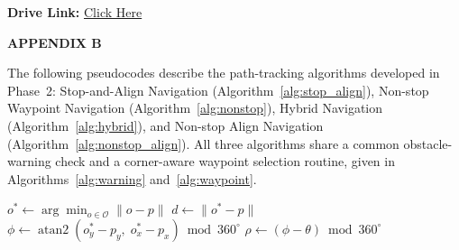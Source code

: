 \documentclass[12pt]{report}
\begin{document}
\vspace{6pt}
\noindent\textbf{Drive Link:} \href{https://drive.google.com/drive/folders/1MPjqoa25L6bo5l17mARg9OGJC1Rv1Niw?usp=drive_link}{Click Here}

\clearpage
\thispagestyle{fancy}
\begin{center}
\textbf{APPENDIX B}
\end{center}

\noindent The following pseudocodes describe the path-tracking algorithms
developed in Phase~2: Stop-and-Align Navigation (Algorithm~\ref{alg:stop_align}),
Non-stop Waypoint Navigation (Algorithm~\ref{alg:nonstop}), Hybrid Navigation
(Algorithm~\ref{alg:hybrid}), and Non-stop Align Navigation
(Algorithm~\ref{alg:nonstop_align}). All three algorithms share a common obstacle-warning
check and a corner-aware waypoint selection routine, given in
Algorithms~\ref{alg:warning} and~\ref{alg:waypoint}.

\vspace{4pt}
{\small
\begin{algorithm}[H]
\caption{CheckWarning$(p,\theta,\mathcal{O},d_{\mathrm{warn}},d_{\mathrm{crit}})$}
\label{alg:warning}
\DontPrintSemicolon
{}
\BlankLine
{}
$o^{*} \leftarrow \arg\min_{o \in \mathcal{O}} \lVert o - p \rVert$\;
$d \leftarrow \lVert o^{*} - p \rVert$\;
$\phi \leftarrow \operatorname{atan2}(o^{*}_y - p_y,\; o^{*}_x - p_x) \bmod 360^{\circ}$\;
$\rho \leftarrow (\phi - \theta) \bmod 360^{\circ}$ 
\end{algorithm}
}
\end{document}
